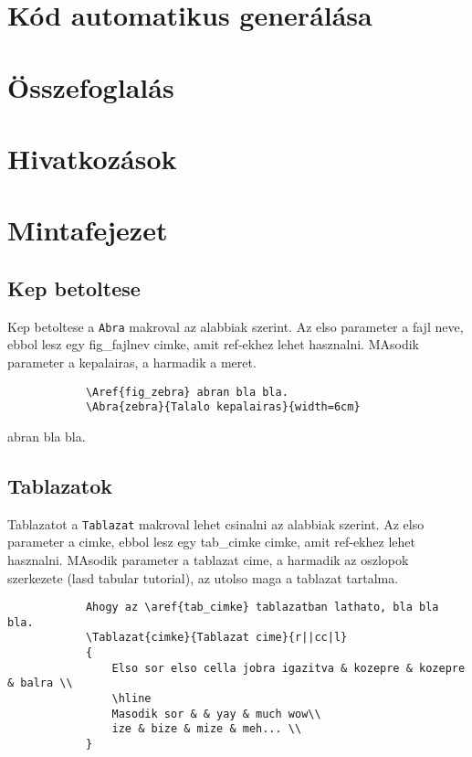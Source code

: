\documentclass[12ppt,a4paper,oneside]{report}
\begin{document}
\chapter{Kód automatikus generálása} %

\chapter{Összefoglalás} %

\chapter*{Hivatkozások}

\appendix

\chapter{Mintafejezet}
    \section{Kep betoltese}
        Kep betoltese a \texttt{Abra} makroval az alabbiak szerint. Az elso parameter a fajl neve, ebbol lesz egy fig\_fajlnev cimke, amit ref-ekhez lehet hasznalni. MAsodik parameter a kepalairas, a harmadik a meret.
        \begin{verbatim}
            \Aref{fig_zebra} abran bla bla.
            \Abra{zebra}{Talalo kepalairas}{width=6cm}
        \end{verbatim}

         abran bla bla.


    \section{Tablazatok}
        Tablazatot a \texttt{Tablazat} makroval lehet csinalni az alabbiak szerint. Az elso parameter a cimke, ebbol lesz egy tab\_cimke cimke, amit ref-ekhez lehet hasznalni. MAsodik parameter a tablazat cime, a harmadik az oszlopok szerkezete (lasd tabular tutorial), az utolso maga a tablazat tartalma.
        \begin{verbatim}
            Ahogy az \aref{tab_cimke} tablazatban lathato, bla bla bla.
            \Tablazat{cimke}{Tablazat cime}{r||cc|l}
            {
                Elso sor elso cella jobra igazitva & kozepre & kozepre & balra \\
                \hline
                Masodik sor & & yay & much wow\\
                ize & bize & mize & meh... \\
            }
        \end{verbatim}
\end{document}
